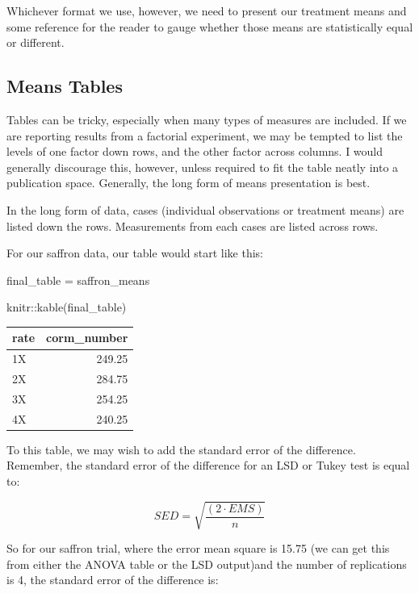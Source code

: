 \documentclass[
]{book}
\newenvironment{Shaded}{\begin{snugshade}}{\end{snugshade}}
\newcommand{\FunctionTok}[1]{\textcolor[rgb]{0.00,0.00,0.00}{#1}}
\newcommand{\NormalTok}[1]{#1}
\newcommand{\OtherTok}[1]{\textcolor[rgb]{0.56,0.35,0.01}{#1}}
\newcommand{\SpecialCharTok}[1]{\textcolor[rgb]{0.00,0.00,0.00}{#1}}
\begin{document}
Whichever format we use, however, we need to present our treatment means and some reference for the reader to gauge whether those means are statistically equal or different.

\hypertarget{means-tables}{%
\subsection{Means Tables}\label{means-tables}}

Tables can be tricky, especially when many types of measures are included. If we are reporting results from a factorial experiment, we may be tempted to list the levels of one factor down rows, and the other factor across columns. I would generally discourage this, however, unless required to fit the table neatly into a publication space. Generally, the long form of means presentation is best.

In the long form of data, cases (individual observations or treatment means) are listed down the rows. Measurements from each cases are listed across rows.

For our saffron data, our table would start like this:

\begin{Shaded}
\begin{Highlighting}[]
\NormalTok{final\_table }\OtherTok{=}\NormalTok{ saffron\_means}

\NormalTok{knitr}\SpecialCharTok{::}\FunctionTok{kable}\NormalTok{(final\_table)}
\end{Highlighting}
\end{Shaded}

\begin{tabular}{l|r}
\hline
rate & corm\_number\\
\hline
1X & 249.25\\
\hline
2X & 284.75\\
\hline
3X & 254.25\\
\hline
4X & 240.25\\
\hline
\end{tabular}

To this table, we may wish to add the standard error of the difference. Remember, the standard error of the difference for an LSD or Tukey test is equal to:

\[ SED = \sqrt{\frac{(2 \cdot EMS)}{n}} \]

So for our saffron trial, where the error mean square is 15.75 (we can get this from either the ANOVA table or the LSD output)and the number of replications is 4, the standard error of the difference is:
\end{document}
